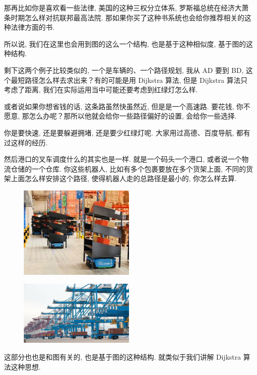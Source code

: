 那再比如你是喜欢看一些法律, 美国的这种三权分立体系, 罗斯福总统在经济大萧条时期怎么样对抗联邦最高法院. 那如果你买了这种书系统也会给你推荐相关的这种法律方面的书. 

所以说, 我们在这里也会用到图的这么一个结构, 也是基于这种相似度, 基于图的这种结构. 

剩下这两个例子比较类似的, 一个是车辆的、一个路径规划, 我从 AD 要到 BD, 这个最短路径怎么样去求出来？有的可能是用 Dijkstra 算法, 但是 Dijkstra 算法只考虑了距离, 我们在实际运用当中可能还要考虑到红绿灯怎么样. 

或者说如果你想省钱的话, 这条路虽然快虽然近, 但是是一个高速路. 要花钱, 你不愿意, 那怎么办呢？那所以他就会给你一些路径偏好的设置, 会给你一些选择. 

你是要快速, 还是要躲避拥堵, 还是要少红绿灯呢. 大家用过高德、百度导航, 都有过这样的经历. 

然后港口的叉车调度什么的其实也是一样. 就是一个码头一个港口, 或者说一个物流仓储的一个仓库. 你这些机器人, 比如有多个包裹要放在多个货架上面, 不同的货架上面怎么样安排这个路径, 使得机器人走的总路径是最小的, 你怎么样去算. 

\begin{figure}[ht]
  \centering
  \includegraphics[width=0.5\textwidth]{asset/aca75bfd-73da-4714-98d3-2f60e8401afd.jpg}
\end{figure}

\begin{figure}[ht]
  \centering
  \includegraphics[width=0.5\textwidth]{asset/3327fbab-a005-4963-a7e9-b413f9ac1c84.jpg}
\end{figure}

这部分也也是和图有关的, 也是基于图的这种结构. 就类似于我们讲解 Dijkstra 算法这种思想. 

